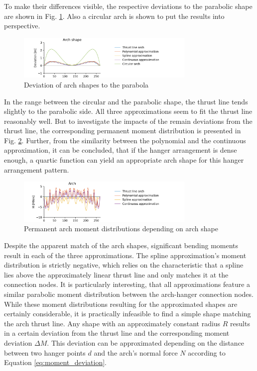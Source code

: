 To make their differences visible, the respective deviations to the parabolic shape are shown in Fig. \ref{fig:arch_shapes_13}. Also a circular arch is shown to put the results into perspective.

\begin{figure}[H]
    \centering
    \includegraphics[trim={1cm 0 3cm 0},clip, width=0.76\textwidth]{calculations/arch shape/arch_shapes_13.png}
    \caption{Deviation of arch shapes to the parabola}
    \label{fig:arch_shapes_13}
\end{figure}

In the range between the circular and the parabolic shape, the thrust line tends slightly to the parabolic side. All three approximations seem to fit the thrust line reasonably well. But to investigate the impacts of the remain deviations from the thrust line, the corresponding permanent moment distribution is presented in Fig. \ref{fig:arch_permanent_moments_13}. Further, from the similarity between the polynomial and the continuous approximation, it can be concluded, that if the hanger arrangement is dense enough, a quartic function can yield an appropriate arch shape for this hanger arrangement pattern. 

\begin{figure}[H]
    \centering
    \includegraphics[trim={1cm 0 3cm 0},clip, width=0.76\textwidth]{calculations/arch shape/permanent state_13.png}
    \caption{Permanent arch moment distributions depending on arch shape}
    \label{fig:arch_permanent_moments_13}
\end{figure}

Despite the apparent match of the arch shapes, significant bending moments result in each of the three approximations. The spline approximation's moment distribution is strictly negative, which relies on the characteristic that a spline lies above the approximately linear thrust line and only matches it at the connection nodes. It is particularly interesting, that all approximations feature a similar parabolic moment distribution between the arch-hanger connection nodes. While these moment distributions resulting for the approximated shapes are certainly considerable, it is practically infeasible to find a simple shape matching the arch thrust line. Any shape with an approximately constant radius $R$ results in a certain deviation from the thrust line and the corresponding moment deviation $\Delta M$. This deviation can be approximated depending on the distance between two hanger points $d$ and the arch's normal force $N$ according to Equation \eqref{eq:moment_deviation}.

